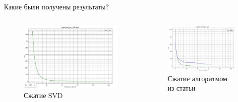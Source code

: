 \documentclass{beamer}
\begin{document}
\begin{frame}{Какие были получены результаты?}
    
    \begin{columns}
        \begin{column}{0.47\textwidth}
            \begin{figure}
                \centering
                    \includegraphics[width=\linewidth]{svd.jpg}
                    \caption{Сжатие SVD}\label{fig:awesome_image1}
            \end{figure}
        \end{column}
        \begin{column}{0.47\textwidth}
            \begin{figure}
                \centering
                    \includegraphics[width=\linewidth]{greed.jpg}
                    \caption{Сжатие алгоритмом из статьи}\label{fig:awesome_image1}
            \end{figure}
        \end{column}
    \end{columns}
        
\end{frame}
\end{document}
